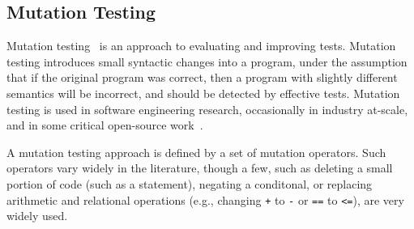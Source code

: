 \subsection{Mutation Testing}

Mutation testing~\cite{MutationSurvey,budd1979mutation,demillo1978hints} is an approach to evaluating and improving tests.  Mutation testing introduces small syntactic changes into a program, under the assumption that if the original program was correct, then a program with slightly different semantics will be incorrect, and should be detected by effective tests.  Mutation testing is used in software engineering research, occasionally in industry at-scale, and in some critical  open-source work~\cite{mutKernel,mutGoogle,mutFacebook}.

A mutation testing approach is defined by a set of mutation operators.  Such operators vary widely in the literature, though a few, such as deleting a small portion of code (such as a statement), negating a conditonal, or replacing arithmetic and relational operations (e.g., changing {\tt +} to {\tt -} or {\tt ==} to {\tt <=}), are very widely used.